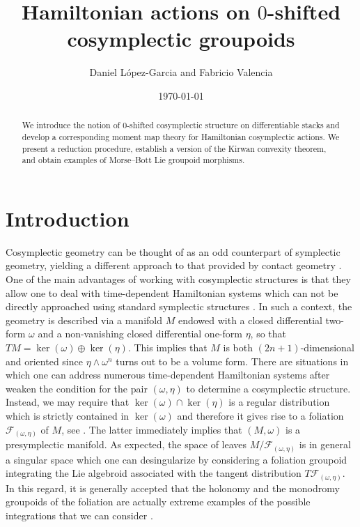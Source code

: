 \documentclass[
  a4paper, 
  reqno, 
  oneside, 
  12pt
]{amsart}
\author{Daniel L\'opez-Garcia {\tiny and } Fabricio Valencia}
\date{\today}
\title{Hamiltonian actions on $0$-shifted cosymplectic groupoids}
\theoremstyle{definition}
\theoremstyle{remark}
\begin{document}
\maketitle


\begin{abstract}
We introduce the notion of 0-shifted cosymplectic structure on differentiable stacks and develop a corresponding moment map theory for Hamiltonian cosymplectic actions. We present a reduction procedure, establish a version of the Kirwan convexity theorem, and obtain examples of Morse–Bott Lie groupoid morphisms.
\end{abstract}

\section{Introduction}

Cosymplectic geometry can be thought of as an odd counterpart of symplectic geometry, yielding a different approach to that provided by contact geometry \cite{Libermann1,Libermann2}. One of the main advantages of working with cosymplectic structures is that they allow one to deal with time-dependent Hamiltonian systems which can not be directly approached using standard symplectic structures \cite{GuzmanMarrero}. In such a context, the geometry is described via a manifold $M$ endowed with a closed differential two-form $\omega$ and a non-vanishing closed differential one-form $\eta$, so that $TM=\ker(\omega)\oplus \ker(\eta)$. This implies that $M$ is both $(2n+1)$-dimensional and oriented since $\eta\wedge \omega^n$ turns out to be a volume form. There are situations in which one can address numerous time-dependent Hamiltonian systems after weaken the condition for the pair $(\omega, \eta)$ to determine a cosymplectic structure. Instead, we may require that $\ker(\omega)\cap \ker(\eta)$ is a regular distribution which is strictly contained in $\ker(\omega)$ and therefore it gives rise to a foliation $\mathcal{F}_{(\omega, \eta)}$ of $M$, see \cite{ChineaDeLeonMarrero}. The latter immediately implies that $(M,\omega)$ is a presymplectic manifold. As expected, the space of leaves $M/\mathcal{F}_{(\omega, \eta)}$ is in general a singular space which one can desingularize by considering a foliation groupoid integrating the Lie algebroid associated with the tangent distribution $T\mathcal{F}_{(\omega, \eta)}$. In this regard, it is generally accepted that the holonomy and the
monodromy groupoids of the foliation are actually extreme examples of the possible integrations that we can consider \cite{CrainicMoerdijk}.
\end{document}
